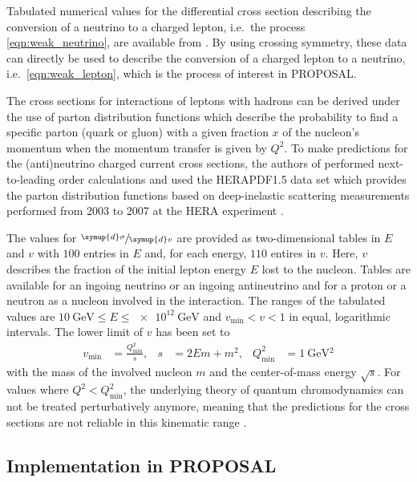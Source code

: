 Tabulated numerical values for the differential cross section describing the conversion of a neutrino to a charged lepton, i.e.\ the process \eqref{eqn:weak_neutrino}, are available from \cite{Cooper_Sarkar_2011}.
By using crossing symmetry, these data can directly be used to describe the conversion of a charged lepton to a neutrino, i.e.\ \eqref{eqn:weak_lepton}, which is the process of interest in PROPOSAL.

The cross sections for interactions of leptons with hadrons can be derived under the use of parton distribution functions which describe the probability to find a specific parton (quark or gluon) with a given fraction $x$ of the nucleon's momentum when the momentum transfer is given by $Q^2$.
To make predictions for the (anti)neutrino charged current cross sections, the authors of \cite{Cooper_Sarkar_2011} performed next-to-leading order calculations and used the HERAPDF1.5 data set which provides the parton distribution functions based on deep-inelastic scattering measurements performed from 2003 to 2007 at the HERA experiment \cite{am2010proton}.

The values for $\sfrac{\symup{d}\sigma}{\symup{d}v}$ are provided as two-dimensional tables in $E$ and $v$ with $\num{100}$ entries in $E$ and, for each energy, $\num{110}$ entires in $v$.  
Here, $v$ describes the fraction of the initial lepton energy $E$ lost to the nucleon.
Tables are available for an ingoing neutrino or an ingoing antineutrino and for a proton or a neutron as a nucleon involved in the interaction.
The ranges of the tabulated values are $\SI{10}{\giga\electronvolt} \leq E \leq \SI{e12}{\giga\electronvolt}$ and $v_\text{min} < v < 1$ in equal, logarithmic intervals.
The lower limit of $v$ has been set to
%
\begin{align}
    v_\text{min} &= \frac{Q^2_{\text{min}}}{s}, & s &= 2 E m + m^2, & Q^2_{\text{min}} &= \SI{1}{\giga\electronvolt^2}
\end{align}
%
with the mass of the involved nucleon $m$ and the center-of-mass energy $\sqrt{s}$.
For values where $Q^2 < Q_\text{min}^2$, the underlying theory of quantum chromodynamics can not be treated perturbatively anymore, meaning that the predictions for the cross sections are not reliable in this kinematic range \cite{Cooper_Sarkar_2011}. 

\subsection{Implementation in PROPOSAL}
\label{sec:weak_implementation}

